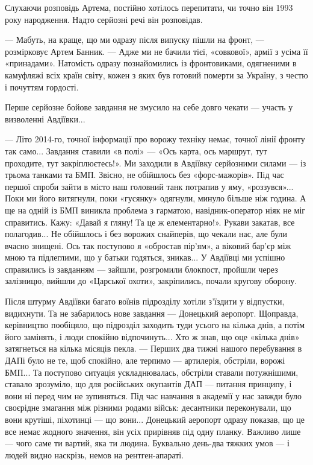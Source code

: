 Слухаючи розповідь Артема, постійно хотілось перепитати, чи точно він 1993 року
народження. Надто серйозні речі він розповідав.

— Мабуть, на краще, що ми одразу після випуску пішли на фронт, — розмірковує
Артем Банник. — Адже ми не бачили тієї, «совкової», армії з усіма її
«принадами». Натомість одразу познайомились із фронтовиками, одягненими в
камуфляжі всіх країн світу, кожен з яких був готовий померти за Україну, з
честю і почуттям гордості.

Перше серйозне бойове завдання не змусило на себе довго чекати — участь у визволенні Авдіївки...

— Літо 2014-го, точної інформації про ворожу техніку немає, точної лінії фронту
так само... Завдання ставили «в полі» — «Ось карта, ось маршрут, тут проходите,
тут закріплюєтесь!». Ми заходили в Авдіївку серйозними силами — із трьома
танками та БМП. Звісно, не обійшлось без «форс-мажорів». Під час першої спроби
зайти в місто наш головний танк потрапив у яму, «роззувся»... Поки ми його
витягнули, поки «гусянку» одягнули, минуло більше ніж година. А ще на одній із
БМП виникла проблема з гарматою, навідник-оператор ніяк не міг справитись.
Кажу: «Давай я гляну! Та це ж елементарно!». Рукави закатав, все полагодив...
Не обійшлось і без ворожих снайперів, що чекали нас, але були вчасно знищені.
Ось так поступово я «обростав пір’ям», а віковий бар’єр між мною та підлеглими,
що у батьки годяться, зникав... У Авдіївці ми успішно справились із завданням —
зайшли, розгромили блокпост, пройшли через залізницю, вийшли до «Царської
охоти», закріпились, почали кругову оборону.

Після штурму Авдіївки багато воїнів підрозділу хотіли з’їздити у відпустки,
видихнути. Та не забарилось нове завдання — Донецький аеропорт. Щоправда,
керівництво пообіцяло, що підрозділ заходить туди усього на кілька днів, а
потім його замінять, і люди спокійно відпочинуть... Хто ж знав, що оце «кілька
днів» затягнеться на кілька місяців пекла.  — Перших два тижні нашого
перебування в ДАПі було не те, щоб спокійно, але терпимо — артилерія, обстріли,
ворожі БМП... Та поступово ситуація ускладнювалась, обстріли ставали
потужнішими, ставало зрозуміло, що для російських окупантів ДАП — питання
принципу, і вони ні перед чим не зупиняться. Під час навчання в академії у нас
завжди було своєрідне змагання між різними родами військ: десантники
переконували, що вони крутіші, піхотинці — що вони... Донецький аеропорт одразу
показав, що це все немає жодного значення, він усіх прирівняв під одну планку.
Важливо лише — чого саме ти вартий, яка ти людина. Буквально день-два тяжких
умов — і людей видно наскрізь, немов на рентген-апараті.


